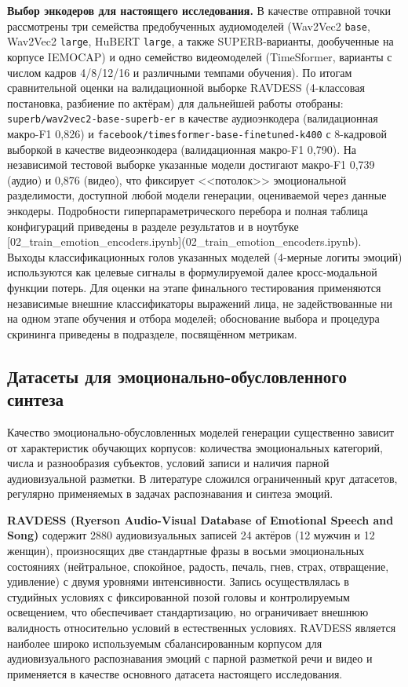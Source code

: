 \documentclass[a4paper, 12pt, oneside, openany]{article}
\begin{document}
\textbf{Выбор энкодеров для настоящего исследования.} В качестве отправной точки рассмотрены три семейства предобученных аудиомоделей (Wav2Vec2 \texttt{base}, Wav2Vec2 \texttt{large}, HuBERT \texttt{large}, а также SUPERB-варианты, дообученные на корпусе IEMOCAP) и одно семейство видеомоделей (TimeSformer, варианты с числом кадров 4/8/12/16 и различными темпами обучения). По итогам сравнительной оценки на валидационной выборке RAVDESS (4-классовая постановка, разбиение по актёрам) для дальнейшей работы отобраны: \texttt{superb/wav2vec2-base-superb-er} в качестве аудиоэнкодера (валидационная макро-F1 0,826) и \texttt{facebook/timesformer-base-finetuned-k400} с 8-кадровой выборкой в качестве видеоэнкодера (валидационная макро-F1 0,790). На независимой тестовой выборке указанные модели достигают макро-F1 0,739 (аудио) и 0,876 (видео), что фиксирует <<потолок>> эмоциональной разделимости, доступной любой модели генерации, оцениваемой через данные энкодеры. Подробности гиперпараметрического перебора и полная таблица конфигураций приведены в разделе результатов и в ноутбуке [02\_train\_emotion\_encoders.ipynb](02\_train\_emotion\_encoders.ipynb). Выходы классификационных голов указанных моделей (4-мерные логиты эмоций) используются как целевые сигналы в формулируемой далее кросс-модальной функции потерь. Для оценки на этапе финального тестирования применяются независимые внешние классификаторы выражений лица, не задействованные ни на одном этапе обучения и отбора моделей; обоснование выбора и процедура скрининга приведены в подразделе, посвящённом метрикам.

\subsection{Датасеты для эмоционально-обусловленного синтеза}

Качество эмоционально-обусловленных моделей генерации существенно зависит от характеристик обучающих корпусов: количества эмоциональных категорий, числа и разнообразия субъектов, условий записи и наличия парной аудиовизуальной разметки. В литературе сложился ограниченный круг датасетов, регулярно применяемых в задачах распознавания и синтеза эмоций.

\textbf{RAVDESS (Ryerson Audio-Visual Database of Emotional Speech and Song)} \cite{livingstone2018ravdess} содержит 2880 аудиовизуальных записей 24 актёров (12 мужчин и 12 женщин), произносящих две стандартные фразы в восьми эмоциональных состояниях (нейтральное, спокойное, радость, печаль, гнев, страх, отвращение, удивление) с двумя уровнями интенсивности. Запись осуществлялась в студийных условиях с фиксированной позой головы и контролируемым освещением, что обеспечивает стандартизацию, но ограничивает внешнюю валидность относительно условий в естественных условиях. RAVDESS является наиболее широко используемым сбалансированным корпусом для аудиовизуального распознавания эмоций с парной разметкой речи и видео и применяется в качестве основного датасета настоящего исследования.
\end{document}
